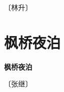 \documentclass[12pt,UTF-8,openany,fontset=none]{ctexbook}
\begin{document}
\begin{center}
    \vspace{10pt}
    
    \begin{large}
        
        〔林升〕
        
    \end{large}
    
    \vspace{8pt}
    
    \begin{huge}
        
        \phantom{。}

        \phantom{。}
        
        \phantom{。}

        \phantom{。}
        
    \end{huge}
    
\end{center}

\vspace{8pt}
\clearpage


\section{枫桥夜泊}



\begin{center}
    {\bfseries 枫桥夜泊}
\end{center}

\begin{center}
    \vspace{10pt}
    
    \begin{large}
        
        〔张继〕
        
    \end{large}
    
    \vspace{8pt}
    
    \begin{huge}
        
        \phantom{。}

        \phantom{。}
        
        \phantom{。}

        \phantom{。}
        
    \end{huge}
    
\end{center}
\end{document}
